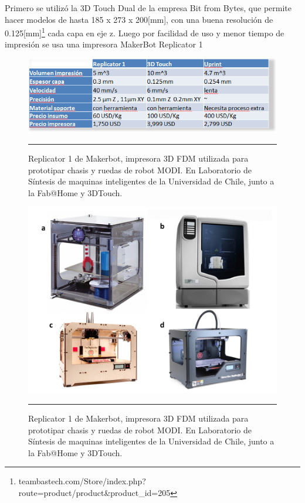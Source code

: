 Primero se utilizó la 3D Touch Dual de la empresa Bit from Bytes, que permite hacer modelos de hasta 185 x 273 x 200[mm], con una buena resolución de 0.125[mm]\footnote{teambastech.com/Store/index.php?route=product/product\&product\_id=205} cada capa en eje z. Luego por facilidad de uso y menor tiempo de impresión se usa una impresora MakerBot Replicator 1

\begin{figure}[htbp]
	\centering
		\includegraphics[width=\textwidth]{./Figures/tabla_impresoras.png}
		\rule{35em}{0.5pt}
	\caption[Replicator1]{Replicator 1 de Makerbot, impresora 3D FDM utilizada para prototipar chasis y ruedas de robot MODI. En Laboratorio de Síntesis de maquinas inteligentes de la Universidad de Chile, junto a la Fab@Home y 3DTouch.}
	\label{fig:replicator}
\end{figure}


\begin{figure}[htbp]
	\centering
		\includegraphics[width=\textwidth]{./Figures/impresoras.png}
		\rule{35em}{0.5pt}
	\caption[Replicator1]{Replicator 1 de Makerbot, impresora 3D FDM utilizada para prototipar chasis y ruedas de robot MODI. En Laboratorio de Síntesis de maquinas inteligentes de la Universidad de Chile, junto a la Fab@Home y 3DTouch.}
	\label{fig:replicator}
\end{figure}	
\FloatBarrier

